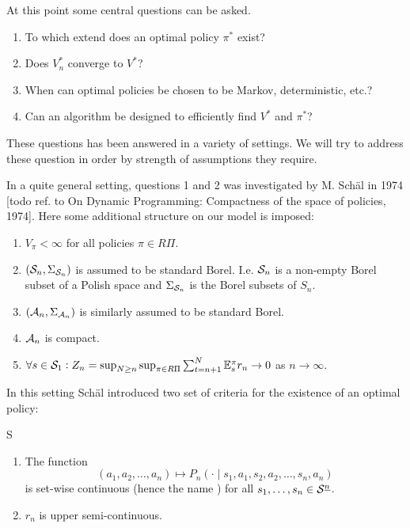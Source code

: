At this point some central questions can be asked.
\begin{enumerate}
  \item To which extend does an optimal policy $\pi^*$ exist?
  \item Does $V_n^*$ converge to $V^*$?
  \item When can optimal policies be chosen to be Markov, deterministic, etc.?
  \item Can an algorithm be designed to efficiently find $V^*$ and
    $\pi^*$?
\end{enumerate}
These questions has been answered in a variety of settings.
We will try to address these question in order by strength of assumptions
they require.

In a quite general setting, questions 1 and 2
was investigated by M. Schäl in 1974
[todo ref. to On Dynamic Programming:
Compactness of the space of policies, 1974].
Here some additional structure on our model is imposed:
\begin{sett}[Schäl]
  \begin{enumerate}
    \item $V_\pi < \infty$ for all policies $\pi \in R\Pi$.
    \item $(\mathcal{S}_n, \Sigma_{\mathcal{S}_n})$ is assumed to be standard Borel.
      I.e. $\mathcal{S}_n$ is a non-empty Borel subset of a Polish space
      and $\Sigma_{\mathcal{S}_n}$ is the Borel subsets of $S_n$.
    \item $(\mathcal{A}_n, \Sigma_{\mathcal{A}_n})$ is similarly assumed to be
      standard Borel.
    \item $\mathcal{A}_n$ is compact.
    \item $\forall s \in \mathcal{S}_1 :
      Z_n = \sup_{N \geq n} \sup_{\pi \in R\Pi} \sum_{t=n+1}^N
      \mathbb{E}_s^\pi r_n \to 0$ as $n \to \infty$.
  \end{enumerate}
  \label{sett:Schal}
\end{sett}

In this setting Schäl introduced two set of criteria for the existence
of an optimal policy:

\begin{cond}{S}
  \begin{enumerate}
    \item The function \[
	(a_1, a_2, \dots, a_n) \mapsto
	P_n(\cdot \mid s_1, a_1, s_2, a_2, \dots, s_n, a_n)
      \]
      is set-wise continuous (hence the name )
      for all $s_1, \dots, s_n \in \mathcal{S}^{\underline{n}}$.
    \item $r_n$ is upper semi-continuous.
  \end{enumerate}
  \label{cond:S}
\end{cond}

